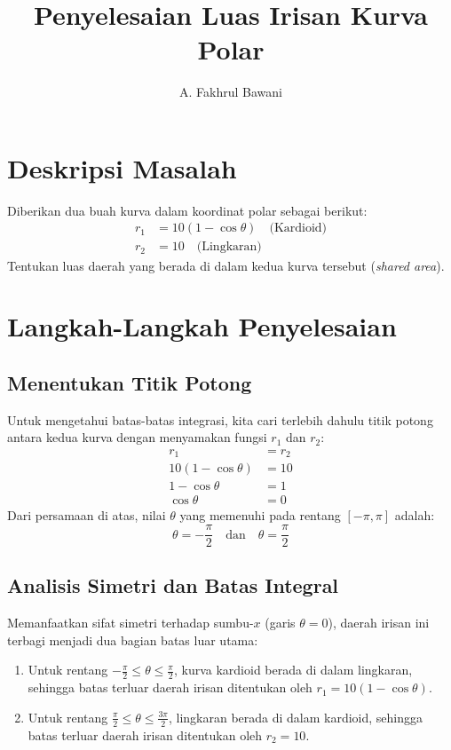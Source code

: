 \documentclass[11pt,a4paper]{article}
\title{\textbf{Penyelesaian Luas Irisan Kurva Polar}}
\author{A. Fakhrul Bawani}
\date{}
\begin{document}
\maketitle

\section{Deskripsi Masalah}
Diberikan dua buah kurva dalam koordinat polar sebagai berikut:
\begin{align}
  r_1 &= 10(1 - \cos\theta) \quad \text{(Kardioid)} \\
  r_2 &= 10 \quad \text{(Lingkaran)}
\end{align}
Tentukan luas daerah yang berada di dalam kedua kurva tersebut (\textit{shared area}).

\section{Langkah-Langkah Penyelesaian}

\subsection{Menentukan Titik Potong}
Untuk mengetahui batas-batas integrasi, kita cari terlebih dahulu titik potong antara kedua kurva dengan menyamakan fungsi $r_1$ dan $r_2$:
\begin{align*}
  r_1 &= r_2 \\
  10(1 - \cos\theta) &= 10 \\
  1 - \cos\theta &= 1 \\
  \cos\theta &= 0
\end{align*}
Dari persamaan di atas, nilai $\theta$ yang memenuhi pada rentang $[-\pi, \pi]$ adalah:
\begin{equation}
  \theta = -\frac{\pi}{2} \quad \text{dan} \quad \theta = \frac{\pi}{2}
\end{equation}

\subsection{Analisis Simetri dan Batas Integral}
Memanfaatkan sifat simetri terhadap sumbu-$x$ (garis $\theta = 0$), daerah irisan ini terbagi menjadi dua bagian batas luar utama:
\begin{enumerate}
  \item Untuk rentang $-\frac{\pi}{2} \le \theta \le \frac{\pi}{2}$, kurva kardioid berada di dalam lingkaran, sehingga batas terluar daerah irisan ditentukan oleh $r_1 = 10(1 - \cos\theta)$.
  \item Untuk rentang $\frac{\pi}{2} \le \theta \le \frac{3\pi}{2}$, lingkaran berada di dalam kardioid, sehingga batas terluar daerah irisan ditentukan oleh $r_2 = 10$.
\end{enumerate}
\end{document}
